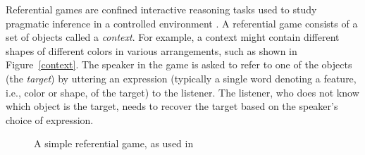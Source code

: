 Referential games are confined interactive reasoning tasks used to
study pragmatic inference in a controlled environment
\cite{StillerGoodman2011:Ad-Hoc-Scalar-I,Frank,Degen}. A referential game
consists of a set of objects called a \textit{context}. For example, a
context might contain different shapes of different colors in various
arrangements, such as shown in Figure~\ref{context}.  The speaker in
the game is asked to refer to one of the objects (the \emph{target})
by uttering an expression (typically a single word denoting a feature,
i.e., color or shape, of the target) to the listener. The listener,
who does not know which object is the target, needs to recover the
target based on the speaker's choice of expression.

\begin{figure}[h] 
  \centering {}\hspace{5mm} 
  \caption{A simple referential game, as used in \cite{Frank}}
\end{figure}


